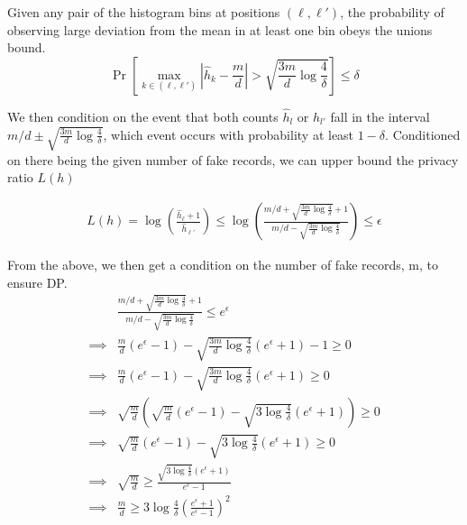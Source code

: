 \documentclass[11pt]{article}
\begin{document}
Given any pair of the histogram bins at positions $(\ell,\ell')$, the probability of observing large deviation from the mean in at least one bin obeys the unions bound.
\[
\Pr \left [ \max_{k \in (\ell,\ell')} \left | \hat{h}_k - \frac{m}{d} \right | >  \sqrt{  \frac{3m}{d} \log{\frac{4}{\delta}} } \right ]  \le \delta
\]

We then condition on the event that both counts $\hat{h}_l$ or $\hat{h}_{l'}$ fall in the interval $m/d \pm \sqrt{  \frac{3m}{d} \log{\frac{4}{\delta}}}$, which event occurs with probability at least $1 - \delta$.  
Conditioned on there being the given number of fake records, we can upper bound the privacy ratio $L(h)$

 \begin{align}
 L(h) =  \log  \left ( \frac{\hat{h}_\ell + 1}{\hat{h}_{\ell'}} \right ) \le \log  \left ( \frac{ m/d + \sqrt{  \frac{3m}{d} \log{\frac{4}{\delta}}} + 1}{  m/d - \sqrt{  \frac{3m}{d} \log{\frac{4}{\delta}}} } \right ) \le \epsilon 
\end{align}

From the above, we then get a condition on the number of fake records, m, to ensure DP.
 \begin{align*}
& \frac{ m/d + \sqrt{  \frac{3m}{d} \log{\frac{4}{\delta}}} + 1}{  m/d - \sqrt{  \frac{3m}{d} \log{\frac{4}{\delta}}}} \le e^\epsilon  \\
\implies & \frac{m}{d} (e^\epsilon - 1) -  \sqrt{  \frac{3m}{d} \log{\frac{4}{\delta}}} (e^\epsilon +1) - 1 \ge 0 \\
\implies & \frac{m}{d} (e^\epsilon - 1) -  \sqrt{  \frac{3m}{d} \log{\frac{4}{\delta}}} (e^\epsilon +1) \ge 0 \\
\implies &\sqrt{  \frac{m}{d}} \left ( \sqrt{  \frac{m}{d}} (e^\epsilon - 1)  - \sqrt{  3 \log{\frac{4}{\delta}}} (e^\epsilon +1) \right ) \ge 0 \\
\implies &\sqrt{  \frac{m}{d}} (e^\epsilon - 1)  - \sqrt{  3 \log{\frac{4}{\delta}}} (e^\epsilon +1)  \ge 0 \\
\implies &\sqrt{  \frac{m}{d}}  \ge  \frac { \sqrt{  3 \log{\frac{4}{\delta}}} (e^\epsilon +1)  } { e^\epsilon - 1 } \\
\implies & \frac{m}{d}  \ge 3\log {\frac{4}{\delta}} \left ( \frac{e^\epsilon +1}{e^\epsilon - 1} \right )^2
\end{align*}
\end{document}
